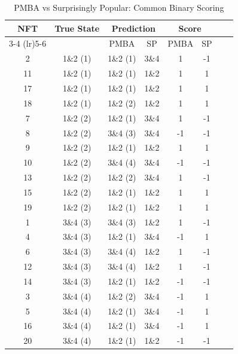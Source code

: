 \documentclass[12pt,reqno]{amsart}
\begin{document}
\begin{table}[htbp]
\centering
\tiny
\begin{threeparttable}
\caption{PMBA vs Surprisingly Popular: Common Binary Scoring}\label{tab:score_comparison}
\begin{tabular}{c@{\hspace{0.3em}}c@{\hspace{0.3em}}c@{\hspace{0.3em}}c@{\hspace{0.3em}}c@{\hspace{0.3em}}c@{\hspace{0.3em}}c@{\hspace{0.3em}}c}
\toprule
\textbf{NFT} & \textbf{True State} & \multicolumn{2}{c}{\textbf{Prediction}} & \multicolumn{2}{c}{\textbf{Score}}  \\
\cmidrule(lr){3-4} \cmidrule(lr){5-6}
& & PMBA & SP & PMBA & SP  \\
\midrule
2  & 1\&2 (1) & 1\&2 (1) & 3\&4 & 1  & -1 \\
11 & 1\&2 (1) & 1\&2 (1) & 1\&2 & 1  & 1 \\
17 & 1\&2 (1) & 1\&2 (1) & 1\&2 & 1  & 1 \\
18 & 1\&2 (1) & 1\&2 (2) & 1\&2 & 1  & 1 \\
7  & 1\&2 (2) & 1\&2 (1) & 3\&4 & 1  & -1 \\
8  & 1\&2 (2) & 3\&4 (3) & 3\&4 & -1 & -1 \\
9  & 1\&2 (2) & 1\&2 (1) & 1\&2 & 1  & 1 \\
10 & 1\&2 (2) & 3\&4 (4) & 3\&4 & -1 & -1 \\
13 & 1\&2 (2) & 1\&2 (2) & 3\&4 & 1  & -1 \\
15 & 1\&2 (2) & 1\&2 (1) & 1\&2 & 1  & 1 \\
19 & 1\&2 (2) & 1\&2 (1) & 1\&2 & 1  & 1 \\
1  & 3\&4 (3) & 3\&4 (3) & 1\&2 & 1  & -1 \\
4  & 3\&4 (3) & 1\&2 (1) & 3\&4 & -1 & 1 \\
6  & 3\&4 (3) & 3\&4 (4) & 1\&2 & 1  & -1 \\
12 & 3\&4 (3) & 3\&4 (4) & 1\&2 & 1  & -1 \\
14 & 3\&4 (3) & 1\&2 (1) & 1\&2 & -1 & -1 \\
3  & 3\&4 (4) & 1\&2 (2) & 3\&4 & -1 & 1 \\
5  & 3\&4 (4) & 1\&2 (1) & 3\&4 & -1 & 1 \\
16 & 3\&4 (4) & 1\&2 (1) & 3\&4 & -1 & 1 \\
20 & 3\&4 (4) & 1\&2 (1) & 1\&2 & -1 & -1 \\

\end{tabular}
\end{threeparttable}
\end{table}
\end{document}
